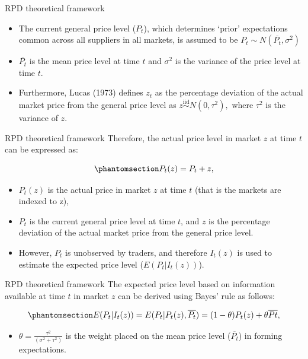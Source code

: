 \documentclass[
  ignorenonframetext,
]{beamer}
\providecommand{\tightlist}{%
  \setlength{\itemsep}{0pt}\setlength{\parskip}{0pt}}\usepackage{longtable,booktabs,array}
\begin{document}
\begin{frame}{RPD theoretical framework}
\label{rpd-theoretical-framework-7}
\begin{itemize}
\tightlist
\item
  The current general price level (\(P_t\)), which determines `prior'
  expectations common across all suppliers in all markets, is assumed to
  be \(P_t \sim N(\overline{P_t}, \sigma^2)\)
\item
  \(\overline{P_t}\) is the mean price level at time \(t\) and
  \(\sigma^2\) is the variance of the price level at time \(t\).
\item
  Furthermore, Lucas (1973) defines \(z_t\) as the percentage deviation
  of the actual market price from the general price level as
  \(z\overset{\text{iid}}{\sim} N(0, \tau^2),\) where \(\tau^2\) is the
  variance of \(z\).
\end{itemize}
\end{frame}

\begin{frame}{RPD theoretical framework}
\label{rpd-theoretical-framework-8}
Therefore, the actual price level in market \(z\) at time \(t\) can be
expressed as:

\begin{equation}\phantomsection\label{eq-price_decomposition}{P_t(z) = P_t + z, }\end{equation}

\begin{itemize}
\tightlist
\item
  \(P_t(z)\) is the actual price in market \(z\) at time \(t\) (that is
  the markets are indexed to z),
\item
  \(P_t\) is the current general price level at time \(t\), and \(z\) is
  the percentage deviation of the actual market price from the general
  price level.
\item
  However, \(P_t\) is unobserved by traders, and therefore \(I_t(z)\) is
  used to estimate the expected price level (\(E(P_t| I_t(z))\)).
\end{itemize}
\end{frame}

\begin{frame}{RPD theoretical framework}
\label{rpd-theoretical-framework-9}
The expected price level based on information available at time \(t\) in
market \(z\) can be derived using Bayes' rule as follows:

\begin{equation}\phantomsection\label{eq-expected_price_level}{ E(P_t| I_t(z))  = E(P_t|P_t(z), \overline{P_t}) = (1-\theta)P_t(z) + \theta\overline{Pt},}\end{equation}

\begin{itemize}
\tightlist
\item
  \(\theta = \frac{\tau^2}{(\sigma^2 + \tau^2)}\) is the weight placed
  on the mean price level (\(\overline{P_t}\)) in forming expectations.
\end{itemize}
\end{frame}
\end{document}

